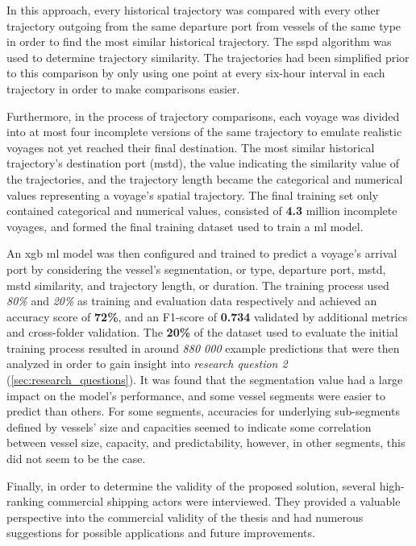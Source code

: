 In this approach, every historical trajectory was compared with every other trajectory outgoing from the same departure port from vessels of the same type in order to find the most similar historical trajectory. The \acrfull{sspd} algorithm was used to determine trajectory similarity. The trajectories had been simplified prior to this comparison by only using one point at every six-hour interval in each trajectory in order to make comparisons easier.

Furthermore, in the process of trajectory comparisons, each voyage was divided into at most four incomplete versions of the same trajectory to emulate realistic voyages not yet reached their final destination. The most similar historical trajectory's destination port (\acrshort{mstd}), the value indicating the similarity value of the trajectories, and the trajectory length became the categorical and numerical values representing a voyage's spatial trajectory. The final training set only contained categorical and numerical values, consisted of \textbf{4.3} million incomplete voyages, and formed the final training dataset used to train a \acrshort{ml} model.

An \acrfull{xgb} \acrshort{ml} model was then configured and trained to predict a voyage's arrival port by considering the vessel's segmentation, or type, departure port, \acrshort{mstd}, \acrshort{mstd} similarity, and trajectory length, or duration. The training process used \textit{80\%} and \textit{20\%} as training and evaluation data respectively and achieved an accuracy score of \textbf{72\%}, and an F1-score of \textbf{0.734} validated by additional metrics and cross-folder validation. The \textbf{20\%} of the dataset used to evaluate the initial training process resulted in around \textit{880 000} example predictions that were then analyzed in order to gain insight into \textit{research question 2} (\cref{sec:research_questions}). It was found that the segmentation value had a large impact on the model's performance, and some vessel segments were easier to predict than others. For some segments, accuracies for underlying sub-segments defined by vessels' size and capacities seemed to indicate some correlation between vessel size, capacity, and predictability, however, in other segments, this did not seem to be the case.

Finally, in order to determine the validity of the proposed solution, several high-ranking commercial shipping actors were interviewed. They provided a valuable perspective into the commercial validity of the thesis and had numerous suggestions for possible applications and future improvements.

